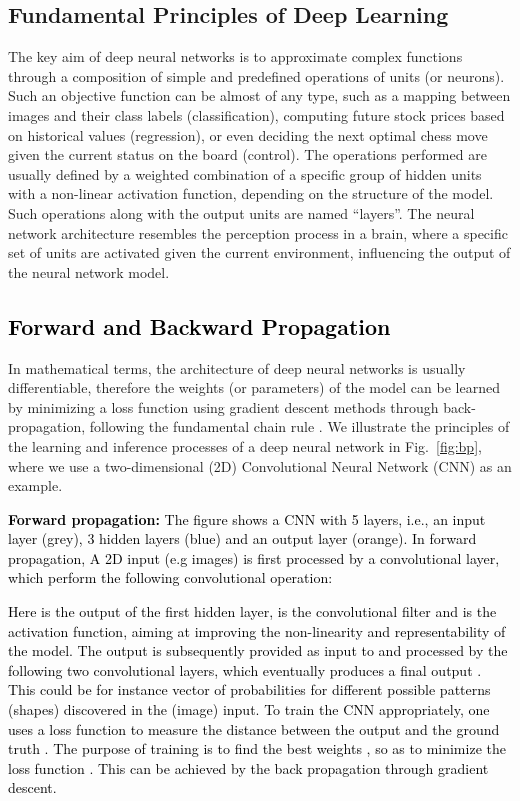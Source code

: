 \documentclass[journal,comsoc,letter]{IEEEtran}
\newcommand{\edit}[1]{\textcolor{black}{#1}}
\begin{document}
 \subsection{Fundamental Principles of Deep Learning}
The key aim of deep neural networks is to approximate complex functions through a composition of simple and predefined operations of units (or neurons). Such an objective function can be almost of any type, such as a mapping between images and their class labels (classification), computing future stock prices based on historical values (regression), or even deciding the next optimal chess move given the current status on the board (control). The operations performed are usually defined by a weighted combination of a specific group of hidden units with a non-linear activation function, depending on the structure of the model. Such operations along with the output units are named ``layers''. The neural network architecture resembles the perception process in a brain, where a specific set of units are activated given the current environment, influencing the output of the neural network model.

\subsection{\edit{Forward and Backward Propagation}}
In mathematical terms, the architecture of deep neural networks is usually differentiable, therefore the weights (or parameters) of the model can be learned by minimizing a loss function using gradient descent methods through back-propagation, following the fundamental chain rule \cite{williams1986learning}. We illustrate the principles of the learning and inference processes of a deep neural network in Fig.~\ref{fig:bp}, where we use a two-dimensional (2D) Convolutional Neural Network (CNN) as an example. \\

\noindent\edit{\textbf{Forward propagation:} The figure shows a CNN with 5 layers, i.e., an input layer (grey), 3 hidden layers (blue) and an output layer (orange). In forward propagation,  A 2D input  (e.g images) is first processed by a convolutional layer, which perform the following convolutional operation:

Here  is the output of the first hidden layer,  is the convolutional filter and  is the activation function, aiming at improving the non-linearity and representability of the model. The output  is subsequently provided as input to and processed by the following two convolutional layers, which eventually produces a final output . This could be for instance vector of probabilities for different possible patterns (shapes) discovered in the (image) input. To train the CNN appropriately, one uses a loss function  to measure the distance between the output  and the ground truth . The purpose of training is to find the best weights , so as to minimize the loss function . This can be achieved by the back propagation through gradient descent.}\\
\end{document}
